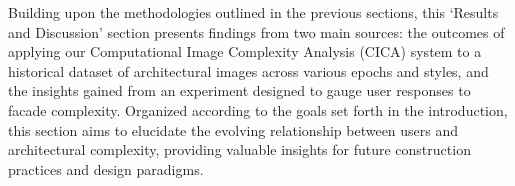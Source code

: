 %



Building upon the methodologies outlined in the previous sections, this `Results and Discussion' section presents findings from two main sources: the outcomes of applying our Computational Image Complexity Analysis (CICA) system to a historical dataset of architectural images across various epochs and styles, and the insights gained from an experiment designed to gauge user responses to facade complexity.
Organized according to the goals set forth in the introduction, this section aims to elucidate the evolving relationship between users and architectural complexity, providing valuable insights for future construction practices and design paradigms.






